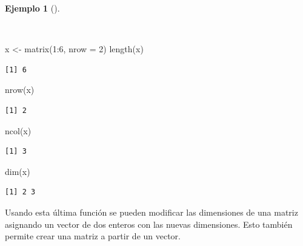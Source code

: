 \documentclass[
  spanish,
  a4paper,
]{scrreport}
\newenvironment{Shaded}{\begin{snugshade}}{\end{snugshade}}
\newcommand{\AttributeTok}[1]{\textcolor[rgb]{0.40,0.45,0.13}{#1}}
\newcommand{\DecValTok}[1]{\textcolor[rgb]{0.68,0.00,0.00}{#1}}
\newcommand{\FunctionTok}[1]{\textcolor[rgb]{0.28,0.35,0.67}{#1}}
\newcommand{\NormalTok}[1]{\textcolor[rgb]{0.00,0.23,0.31}{#1}}
\newcommand{\OtherTok}[1]{\textcolor[rgb]{0.00,0.23,0.31}{#1}}
\newcommand{\SpecialCharTok}[1]{\textcolor[rgb]{0.37,0.37,0.37}{#1}}
\theoremstyle{definition}
\theoremstyle{definition}
\newtheorem{example}{Ejemplo}[chapter]
\theoremstyle{remark}
\begin{document}
\begin{example}[]\protect\hypertarget{exm-dimensiones-matriz}{}\label{exm-dimensiones-matriz}

~

\begin{Shaded}
\begin{Highlighting}[]
\NormalTok{x }\OtherTok{\textless{}{-}} \FunctionTok{matrix}\NormalTok{(}\DecValTok{1}\SpecialCharTok{:}\DecValTok{6}\NormalTok{, }\AttributeTok{nrow =} \DecValTok{2}\NormalTok{)}
\FunctionTok{length}\NormalTok{(x)}
\end{Highlighting}
\end{Shaded}

\begin{verbatim}
[1] 6
\end{verbatim}

\begin{Shaded}
\begin{Highlighting}[]
\FunctionTok{nrow}\NormalTok{(x)}
\end{Highlighting}
\end{Shaded}

\begin{verbatim}
[1] 2
\end{verbatim}

\begin{Shaded}
\begin{Highlighting}[]
\FunctionTok{ncol}\NormalTok{(x)}
\end{Highlighting}
\end{Shaded}

\begin{verbatim}
[1] 3
\end{verbatim}

\begin{Shaded}
\begin{Highlighting}[]
\FunctionTok{dim}\NormalTok{(x)}
\end{Highlighting}
\end{Shaded}

\begin{verbatim}
[1] 2 3
\end{verbatim}

\end{example}

Usando esta última función se pueden modificar las dimensiones de una
matriz asignando un vector de dos enteros con las nuevas dimensiones.
Esto también permite crear una matriz a partir de un vector.
\end{document}
